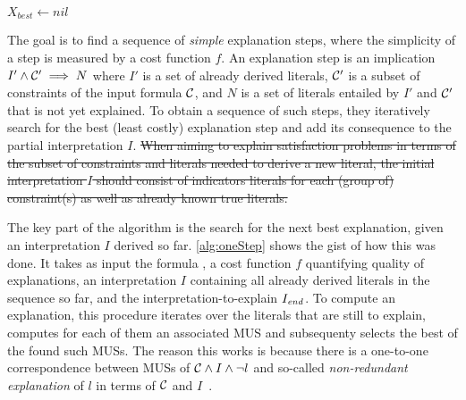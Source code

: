 \newcommand\onestep{\ensuremath{\call{explain-One-Step}}\xspace}

\begin{algorithm}[t]
  \caption{$\onestep(\formulac,f,I,\Iend)$}
  \label{alg:oneStep}
$X_{best} \gets \mathit{nil}$\;
\end{algorithm}


The goal is to find a sequence of \textit{simple} explanation steps, where the simplicity of a step is measured by a cost function $f$. 
An explanation step is an implication $I' \wedge \mathcal{C} ' \implies N$ where $I'$ is a set of already derived literals, $\mathcal{C} '$ is a subset of constraints of the input formula $\mathcal{C} $, and $N$ is a set of literals entailed by $I'$ and $\mathcal{C} '$ that is not yet explained.
To obtain a sequence of such steps, they iteratively search for the best (least costly) explanation step and add its consequence to the partial interpretation $I$.
\sout{
When aiming to explain satisfaction problems in terms of the subset of constraints and literals needed to derive a new literal, the initial interpretation $I$ should consist of indicators literals for each (group of) constraint(s) as well as already known true literals. }

The key part of the algorithm is the search for the next best explanation, given an interpretation $I$ derived so far. 
\cref{alg:oneStep} shows the gist of how this was done.
It takes as input the formula \formulac, a cost function $f$ quantifying quality of explanations, an interpretation $I$ containing all already derived literals in the sequence so far, and the interpretation-to-explain $I_\mathit{end} $. 
To compute an explanation, this procedure iterates over the literals that are still to explain, computes for each of them an associated MUS and subsequenty selects the best of the found such MUSs.  
The reason this works is because there is a one-to-one correspondence between MUSs of $\mathcal{C}  \land I \land \neg l$ and so-called \emph{non-redundant explanation} of $l$ in terms of $\mathcal{C} $ and $I$~\cite{ecai/BogaertsGCG20}. 


